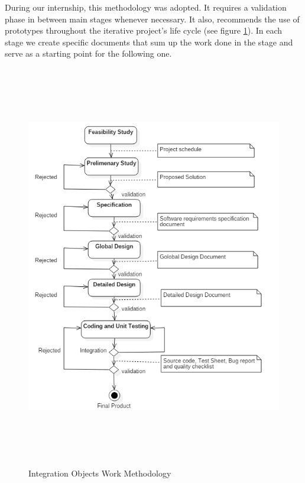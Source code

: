 During our internship, this methodology was adopted. It requires a validation phase in
between main stages whenever necessary. It also, recommends the use of prototypes throughout the iterative project’s life cycle (see figure \ref{fig2}). In each stage we create specific documents that sum up the work done in the stage and serve as a starting point for the following one.
\begin{figure}[!ht]
\begin{center}
\includegraphics[width=14.8cm,height=17.8cm]{chapter1/fig2.png}
\end{center}
\caption{Integration Objects Work Methodology}
\label{fig2}
\end{figure}
